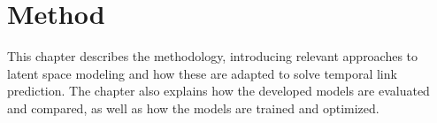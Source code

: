 \chapter{Method}\label{ch:Method}

This chapter describes the methodology, introducing relevant approaches to latent space modeling and how these are adapted to solve temporal link prediction. The chapter also explains how the developed models are evaluated and compared, as well as how the models are trained and optimized.









